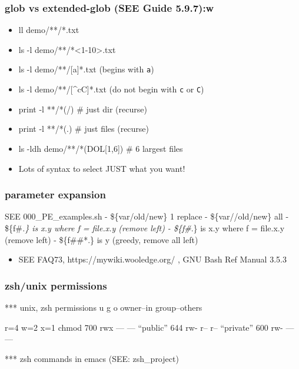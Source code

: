 \documentclass[
  letterpaper,
  DIV=11,
  numbers=noendperiod]{scrartcl}
\providecommand{\tightlist}{%
  \setlength{\itemsep}{0pt}\setlength{\parskip}{0pt}}\usepackage{longtable,booktabs,array}
\begin{document}
\subsubsection{glob vs extended-glob (SEE Guide
5.9.7):w}\label{glob-vs-extended-glob-see-guide-5.9.7w}

\begin{itemize}
\tightlist
\item
  ll demo/**/*.txt
\item
  ls -l demo/**/*\textless1-10\textgreater.txt
\item
  ls -l demo/**/{[}a{]}*.txt (begins with \texttt{a})
\item
  ls -l demo/**/{[}\^{}cC{]}*.txt (do not begin with \texttt{c} or
  \texttt{C})
\item
  print -l **/*(/) \# just dir (recurse)
\item
  print -l **/*(.) \# just files (recurse)
\item
  ls -ldh demo/**/*(DOL{[}1,6{]}) \# 6 largest files
\item
  Lots of syntax to select JUST what you want!
\end{itemize}

\subsubsection{parameter expansion}\label{parameter-expansion}

SEE 000\_PE\_examples.sh - \$\{var/old/new\} 1 replace -
\$\{var//old/new\} all - \$\{f\#\emph{.\} is x.y where f = file.x.y
(remove left) - \$\{f\#}.\} is x.y where f = file.x.y (remove left) -
\$\{f\#\#*.\} is y (greedy, remove all left)

\begin{itemize}
\tightlist
\item
  SEE FAQ73, https://mywiki.wooledge.org/ , GNU Bash Ref Manual 3.5.3
\end{itemize}

\subsubsection{zsh/unix permissions}\label{zshunix-permissions}

*** unix, zsh permissions u g o owner--in group--others

r=4 w=2 x=1 chmod 700 rwx --- --- ``public'' 644 rw- r-- r-- ``private''
600 rw- --- ---

*** zsh commands in emacs (SEE: zsh\_project)
\end{document}
